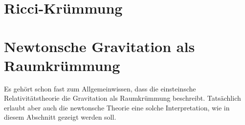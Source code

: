 %
%
\section{Ricci-Krümmung
\label{buch:kruemmung:section:ricci}}



%
%
\section{Newtonsche Gravitation als Raumkrümmung
\label{buch:kruemmung:section:newton}}
Es gehört schon fast zum Allgemeinwissen, dass die einsteinsche
Relativitätstheorie die Gravitation als Raumkrümmung beschreibt.
Tatsächlich erlaubt aber auch die newtonsche Theorie eine solche
Interpretation, wie in diesem Abschnitt gezeigt werden soll.

%
%
